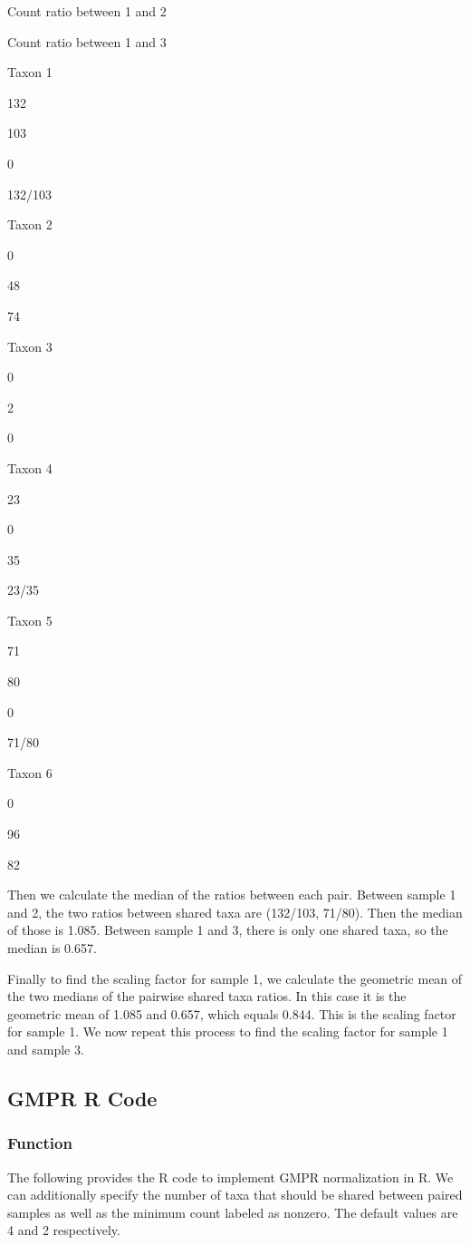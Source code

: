 \documentclass[
]{book}
\begin{document}
Count ratio between 1 and 2

Count ratio between 1 and 3

Taxon 1

132

103

0

132/103

Taxon 2

0

48

74

Taxon 3

0

2

0

Taxon 4

23

0

35

23/35

Taxon 5

71

80

0

71/80

Taxon 6

0

96

82

Then we calculate the median of the ratios between each pair. Between sample 1 and 2, the two ratios between shared taxa are (132/103, 71/80). Then the median of those is 1.085. Between sample 1 and 3, there is only one shared taxa, so the median is 0.657.

Finally to find the scaling factor for sample 1, we calculate the geometric mean of the two medians of the pairwise shared taxa ratios. In this case it is the geometric mean of 1.085 and 0.657, which equals 0.844. This is the scaling factor for sample 1.
We now repeat this process to find the scaling factor for sample 1 and sample 3.

\hypertarget{gmpr-r-code}{%
\subsection{GMPR R Code}\label{gmpr-r-code}}

\hypertarget{function-3}{%
\subsubsection{Function}\label{function-3}}

The following provides the R code to implement GMPR normalization in R. We can additionally specify the number of taxa that should be shared between paired samples as well as the minimum count labeled as nonzero. The default values are 4 and 2 respectively.
\end{document}
